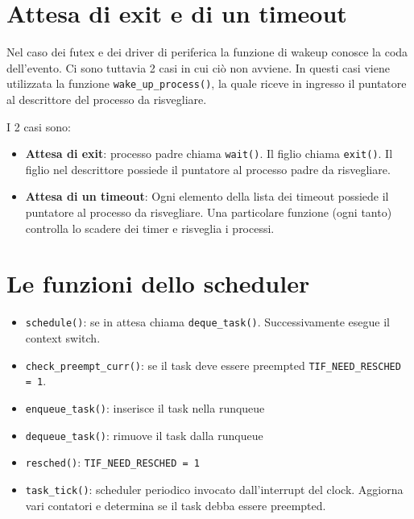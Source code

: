 \documentclass[12pt, a4paper]{report}
\begin{document}
\section{Attesa di exit e di un timeout}
Nel caso dei futex e dei driver di periferica la funzione di wakeup conosce la
coda dell'evento. Ci sono tuttavia 2 casi in cui ciò non avviene. In questi
casi viene utilizzata la funzione \texttt{wake\_up\_process()}, la quale riceve
in ingresso il puntatore al descrittore del processo da risvegliare.

I 2 casi sono:
\begin{itemize}
	\item \textbf{Attesa di exit}: processo padre chiama \texttt{wait()}. Il
		figlio chiama \texttt{exit()}. Il figlio nel descrittore possiede il
		puntatore al processo padre da risvegliare.
	\item \textbf{Attesa di un timeout}: Ogni elemento della lista dei timeout
		possiede il puntatore al processo da risvegliare. Una particolare
		funzione (ogni tanto) controlla lo scadere dei timer e risveglia i
		processi.
\end{itemize}

\section{Le funzioni dello scheduler}
\begin{itemize}
	\item \texttt{schedule()}: se in attesa chiama \texttt{deque\_task()}.
		Successivamente esegue il context switch.
	\item \texttt{check\_preempt\_curr()}: se il task deve essere preempted
		\texttt{TIF\_NEED\_RESCHED = 1}.
	\item \texttt{enqueue\_task()}: inserisce il task nella runqueue
	\item \texttt{dequeue\_task()}: rimuove il task dalla runqueue
	\item \texttt{resched()}: \texttt{TIF\_NEED\_RESCHED = 1}
	\item \texttt{task\_tick()}: scheduler periodico invocato dall'interrupt del
		clock. Aggiorna vari contatori e determina se il task debba essere
		preempted.
\end{itemize}
\end{document}
